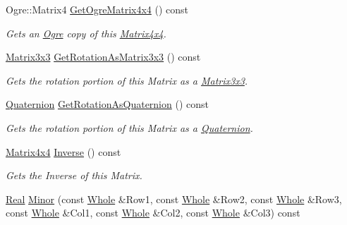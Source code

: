\begin{DoxyCompactItemize}
Ogre::Matrix4 \hyperlink{classMezzanine_1_1Matrix4x4_a82c48555352de02a8e8fec1bd48f8699}{GetOgreMatrix4x4} () const 
\begin{DoxyCompactList}\small\item\em Gets an \hyperlink{namespaceOgre}{Ogre} copy of this \hyperlink{classMezzanine_1_1Matrix4x4}{Matrix4x4}. \item\end{DoxyCompactList}\item 
\hyperlink{classMezzanine_1_1Matrix3x3}{Matrix3x3} \hyperlink{classMezzanine_1_1Matrix4x4_abfef465fa32bb60cda6a7f21a61c7016}{GetRotationAsMatrix3x3} () const 
\begin{DoxyCompactList}\small\item\em Gets the rotation portion of this Matrix as a \hyperlink{classMezzanine_1_1Matrix3x3}{Matrix3x3}. \item\end{DoxyCompactList}\item 
\hyperlink{classMezzanine_1_1Quaternion}{Quaternion} \hyperlink{classMezzanine_1_1Matrix4x4_a51046e0d0d0caca1e66b8aed8a161884}{GetRotationAsQuaternion} () const 
\begin{DoxyCompactList}\small\item\em Gets the rotation portion of this Matrix as a \hyperlink{classMezzanine_1_1Quaternion}{Quaternion}. \item\end{DoxyCompactList}\item 
\hyperlink{classMezzanine_1_1Matrix4x4}{Matrix4x4} \hyperlink{classMezzanine_1_1Matrix4x4_a6b7fda3ac627b32e0032c0c6ca476abc}{Inverse} () const 
\begin{DoxyCompactList}\small\item\em Gets the Inverse of this Matrix. \item\end{DoxyCompactList}\item 
\hyperlink{namespaceMezzanine_a726731b1a7df72bf3583e4a97282c6f6}{Real} \hyperlink{classMezzanine_1_1Matrix4x4_a81db9634d7306f76211e73ab42edf0db}{Minor} (const \hyperlink{namespaceMezzanine_adcbb6ce6d1eb4379d109e51171e2e493}{Whole} \&Row1, const \hyperlink{namespaceMezzanine_adcbb6ce6d1eb4379d109e51171e2e493}{Whole} \&Row2, const \hyperlink{namespaceMezzanine_adcbb6ce6d1eb4379d109e51171e2e493}{Whole} \&Row3, const \hyperlink{namespaceMezzanine_adcbb6ce6d1eb4379d109e51171e2e493}{Whole} \&Col1, const \hyperlink{namespaceMezzanine_adcbb6ce6d1eb4379d109e51171e2e493}{Whole} \&Col2, const \hyperlink{namespaceMezzanine_adcbb6ce6d1eb4379d109e51171e2e493}{Whole} \&Col3) const 

\end{DoxyCompactItemize}
